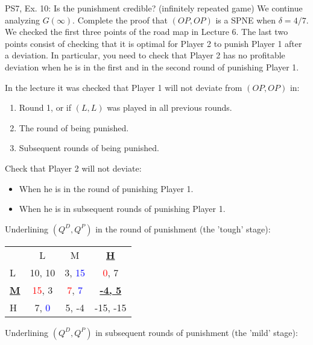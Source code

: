 \begin{frame}{PS7, Ex. 10: Is the punishment credible? (infinitely repeated game)}
    We continue analyzing $G(\infty)$. Complete the proof that $(OP,OP)$ is a SPNE when $\delta=4/7$. We checked the first three points of the road map in Lecture 6. The last two points consist of checking that it is optimal for Player 2 to punish Player 1 after a deviation. In particular, you need to check that Player 2 has no profitable deviation when he is in the first and in the second round of punishing Player 1.
  \begin{multicols}{2}
    In the lecture it was checked that Player 1 will not deviate from $(OP,OP)$ in:
    \begin{enumerate}
      \item Round 1, or if $(L,L)$ was played in all previous rounds.
      \item The  round of being punished.
      \item Subsequent rounds of being punished.
    \end{enumerate}
    Check that Player 2 will not deviate:
    \begin{itemize}
      \item[4.] When he is in the  round of punishing Player 1.
      \item[5.] When he is in subsequent rounds of punishing Player 1.
    \end{itemize}
    \vfill\null\columnbreak
    Underlining $(Q^D,Q^P)$ in the  round of punishment (the 'tough' stage):
    \vspace{-6pt}
    \begin{table}
      \begin{tabular}{l|c|c|c|}
        \multicolumn{1}{c}{} & \multicolumn{1}{c}{L} & \multicolumn{1}{c}{M} & \multicolumn{1}{c}{\textbf{\underline{H}}} \\\cline{2-4}
        L & 10, 10 & 3, \textcolor{blue}{15} & \textcolor{red}{0}, 7 \\\cline{2-4}
        \textbf{\underline{M}} & \textcolor{red}{15}, 3 & \textcolor{red}{7}, \textcolor{blue}{7} & \textbf{\underline{-4, 5}} \\\cline{2-4}
        H & 7, \textcolor{blue}{0} & 5, -4 & -15, -15 \\\cline{2-4}
      \end{tabular}
    \end{table}
    Underlining $(Q^D,Q^P)$ in subsequent rounds of punishment (the 'mild' stage):
    \vspace{-6pt}

\end{multicols}
\end{frame}
